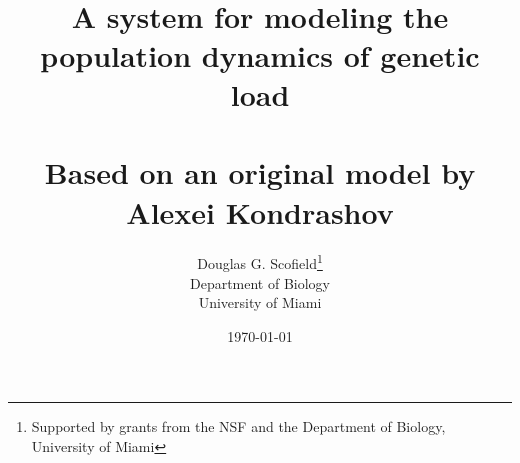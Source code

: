 \documentclass[12pt,twoside,letterpaper,fleqn]{report}
\numberwithin{equation}{section}  %
\begin{document}
\title{\K \\ \  \\ A system for modeling the population dynamics of genetic load \\ \  \\ Based on an original model by Alexei Kondrashov}
\author{Douglas G. Scofield\thanks{Supported by grants from the NSF and the Department of Biology, University of Miami} \\ Department of Biology \\ University of Miami}
\date{\today}
\singlespacing
\doublespacing









\end{document}
